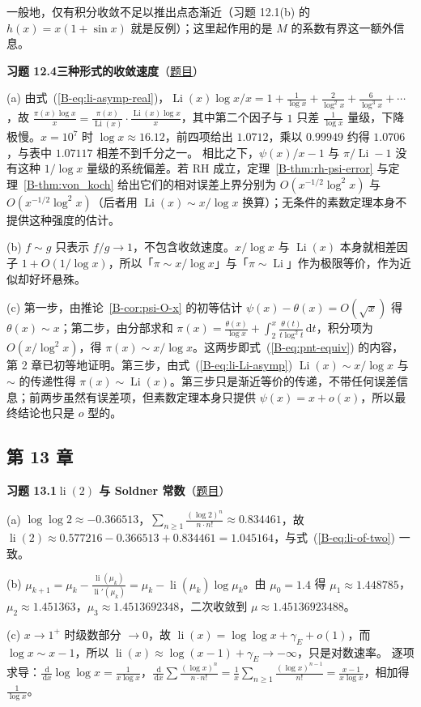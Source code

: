 \documentclass[11pt,a4paper]{article}
\DeclareMathOperator{\Li}{Li}
\DeclareMathOperator{\li}{li}
\newcommand{\dd}{\,\mathrm{d}}
\newcommand{\bref}[1]{\ref*{B-#1}}
\newcommand{\Sol}[2]{%
  \par\addvspace{1.2em}\noindent
  \hypertarget{s:#1}{}\textbf{习题 #1\quad #2}\hfill{\small（\hyperlink{q:#1}{题目}）}\par
  \nopagebreak\smallskip}
\begin{document}
一般地，仅有积分收敛不足以推出点态渐近（习题 12.1(b) 的 $h(x)=x(1+\sin x)$ 就是反例）；这里起作用的是 $M$ 的系数有界这一额外信息。

\Sol{12.4}{三种形式的收敛速度}
(a) 由式~(\bref{eq:li-asymp-real})，$\Li(x)\log x/x=1+\frac1{\log x}+\frac2{\log^2x}+\frac6{\log^3x}+\cdots$，故
$\frac{\pi(x)\log x}x=\frac{\pi(x)}{\Li(x)}\cdot\frac{\Li(x)\log x}x$，其中第二个因子与 $1$ 只差 $\frac1{\log x}$ 量级，下降极慢。$x=10^7$ 时 $\log x\approx16.12$，前四项给出 $1.0712$，乘以 $0.99949$ 约得 $1.0706$，与表中 $1.07117$ 相差不到千分之一。
相比之下，$\psi(x)/x-1$ 与 $\pi/\Li-1$ 没有这种 $1/\log x$ 量级的系统偏差。若 RH 成立，定理~\bref{thm:rh-psi-error} 与定理~\bref{thm:von_koch} 给出它们的相对误差上界分别为 $O(x^{-1/2}\log^2x)$ 与 $O(x^{-1/2}\log^2x)$（后者用 $\Li(x)\sim x/\log x$ 换算）；无条件的素数定理本身不提供这种强度的估计。

(b) $f\sim g$ 只表示 $f/g\to1$，不包含收敛速度。$x/\log x$ 与 $\Li(x)$ 本身就相差因子 $1+O(1/\log x)$，所以「$\pi\sim x/\log x$」与「$\pi\sim\Li$」作为极限等价，作为近似却好坏悬殊。

(c) 第一步，由推论~\bref{cor:psi-O-x} 的初等估计 $\psi(x)-\theta(x)=O(\sqrt x)$ 得 $\theta(x)\sim x$；第二步，由分部求和 $\pi(x)=\frac{\theta(x)}{\log x}+\int_2^x\frac{\theta(t)}{t\log^2t}\dd t$，积分项为 $O(x/\log^2x)$，得 $\pi(x)\sim x/\log x$。这两步即式~(\bref{eq:pnt-equiv}) 的内容，第 2 章已初等地证明。第三步，由式~(\bref{eq:li-Li-asymp}) $\Li(x)\sim x/\log x$ 与 $\sim$ 的传递性得 $\pi(x)\sim\Li(x)$。第三步只是渐近等价的传递，不带任何误差信息；前两步虽然有误差项，但素数定理本身只提供 $\psi(x)=x+o(x)$，所以最终结论也只是 $o$ 型的。

\subsection*{第 13 章}

\Sol{13.1}{$\li(2)$ 与 Soldner 常数}
(a) $\log\log2\approx-0.366513$，$\sum_{n\ge1}\frac{(\log2)^n}{n\cdot n!}\approx0.834461$，故 $\li(2)\approx0.577216-0.366513+0.834461=1.045164$，与式~(\bref{eq:li-of-two}) 一致。

(b) $\mu_{k+1}=\mu_k-\frac{\li(\mu_k)}{\li'(\mu_k)}=\mu_k-\li(\mu_k)\log\mu_k$。由 $\mu_0=1.4$ 得
$\mu_1\approx1.448785$，$\mu_2\approx1.451363$，$\mu_3\approx1.4513692348$，二次收敛到 $\mu\approx1.45136923488$。

(c) $x\to1^+$ 时级数部分 $\to0$，故 $\li(x)=\log\log x+\gamma_E+o(1)$，而 $\log x\sim x-1$，所以 $\li(x)\approx\log(x-1)+\gamma_E\to-\infty$，只是对数速率。
逐项求导：$\frac{\dd}{\dd x}\log\log x=\frac1{x\log x}$，$\frac{\dd}{\dd x}\sum\frac{(\log x)^n}{n\cdot n!}=\frac1x\sum_{n\ge1}\frac{(\log x)^{n-1}}{n!}=\frac{x-1}{x\log x}$，相加得 $\frac1{\log x}$。
\end{document}
